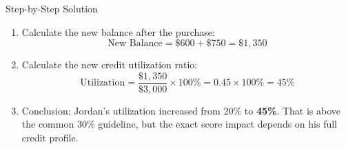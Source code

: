\begin{block}{Step-by-Step Solution}
  \begin{enumerate}
    \item Calculate the new balance after the purchase:
      \[
        \text{New Balance} = \$600 + \$750 = \$1,350
      \]
    \item Calculate the new credit utilization ratio:
      \[
        \text{Utilization} = \frac{\$1,350}{\$3,000} \times 100\% = 0.45 \times 100\% = 45\%
      \]
    \item Conclusion:
      Jordan's utilization increased from $20\%$ to \textbf{45\%}. That is above the common 30\% guideline, but the exact score impact depends on his full credit profile.
  \end{enumerate}
\end{block}
